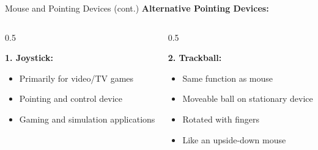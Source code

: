 \documentclass[aspectratio=169]{beamer}
\begin{document}
\begin{frame}{Mouse and Pointing Devices (cont.)}
     \textbf{Alternative Pointing Devices:}
    
    \begin{columns}
        \begin{column}{0.5\textwidth} 

 \textbf{1. Joystick:}
            \begin{itemize}
                \item Primarily for video/TV games
                \item Pointing and control device
                \item Gaming and simulation applications
            \end{itemize}
            
        \end{column}
        \begin{column}{0.5\textwidth}
        
            \textbf{2. Trackball:}
            \begin{itemize}
                \item Same function as mouse
                \item Moveable ball on stationary device
                \item Rotated with fingers
                \item Like an upside-down mouse
            \end{itemize}
        \end{column}
    \end{columns}
    
  
\end{frame}
\end{document}
